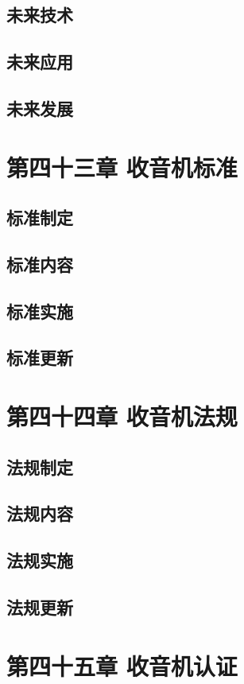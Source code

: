 \documentclass[12pt,UTF8]{ctexbook}
\begin{document}
\section{未来技术}
\section{未来应用}
\section{未来发展}

\chapter{第四十三章 收音机标准}

\section{标准制定}
\section{标准内容}
\section{标准实施}
\section{标准更新}

\chapter{第四十四章 收音机法规}

\section{法规制定}
\section{法规内容}
\section{法规实施}
\section{法规更新}

\chapter{第四十五章 收音机认证}
\end{document}
